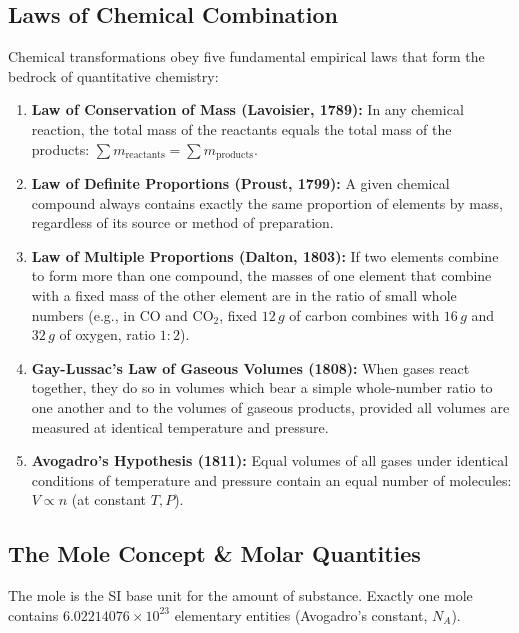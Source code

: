 \documentclass[10pt,twoside,openright]{book}
\begin{document}
\subsection{Laws of Chemical Combination}
Chemical transformations obey five fundamental empirical laws that form the bedrock of quantitative chemistry:
\begin{enumerate}
  \item \textbf{Law of Conservation of Mass (Lavoisier, 1789):} In any chemical reaction, the total mass of the reactants equals the total mass of the products: $\sum m_{\text{reactants}} = \sum m_{\text{products}}$.
  \item \textbf{Law of Definite Proportions (Proust, 1799):} A given chemical compound always contains exactly the same proportion of elements by mass, regardless of its source or method of preparation.
  \item \textbf{Law of Multiple Proportions (Dalton, 1803):} If two elements combine to form more than one compound, the masses of one element that combine with a fixed mass of the other element are in the ratio of small whole numbers (e.g., in $\mathrm{CO}$ and $\mathrm{CO_2}$, fixed $12\,\si{g}$ of carbon combines with $16\,\si{g}$ and $32\,\si{g}$ of oxygen, ratio $1:2$).
  \item \textbf{Gay-Lussac's Law of Gaseous Volumes (1808):} When gases react together, they do so in volumes which bear a simple whole-number ratio to one another and to the volumes of gaseous products, provided all volumes are measured at identical temperature and pressure.
  \item \textbf{Avogadro's Hypothesis (1811):} Equal volumes of all gases under identical conditions of temperature and pressure contain an equal number of molecules: $V \propto n$ (at constant $T, P$).
\end{enumerate}

\subsection{The Mole Concept \& Molar Quantities}
The mole is the SI base unit for the amount of substance. Exactly one mole contains $6.02214076 \times 10^{23}$ elementary entities (Avogadro's constant, $N_A$).
\end{document}
